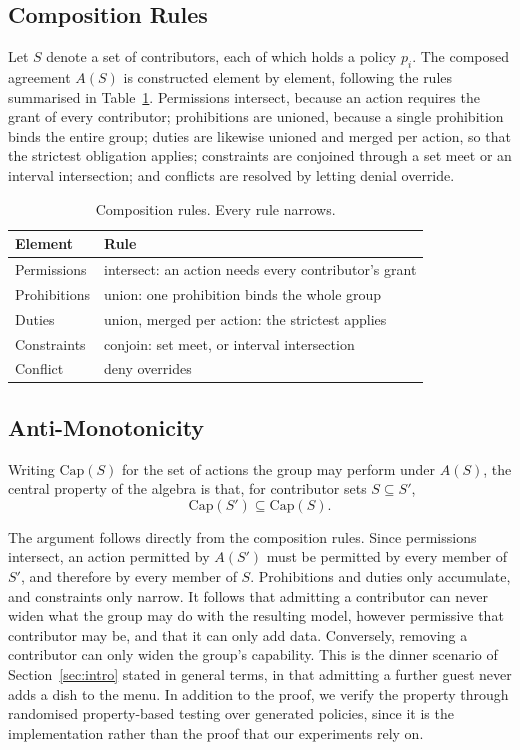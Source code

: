 \documentclass[sigconf,anonymous,review]{acmart}
\begin{document}
\subsection{Composition Rules}

Let $S$ denote a set of contributors, each of which holds a policy $p_i$. The
composed agreement $A(S)$ is constructed element by element, following the rules
summarised in Table~\ref{tab:rules}. Permissions intersect, because an action
requires the grant of every contributor; prohibitions are unioned, because a
single prohibition binds the entire group; duties are likewise unioned and merged
per action, so that the strictest obligation applies; constraints are conjoined
through a set meet or an interval intersection; and conflicts are resolved by
letting denial override.

\begin{table}[h]
\caption{Composition rules. Every rule narrows.}
\label{tab:rules}
\begin{tabular}{ll}
\toprule
Element & Rule \\
\midrule
Permissions & intersect: an action needs every contributor's grant \\
Prohibitions & union: one prohibition binds the whole group \\
Duties & union, merged per action: the strictest applies \\
Constraints & conjoin: set meet, or interval intersection \\
Conflict & deny overrides \\
\bottomrule
\end{tabular}
\end{table}

\subsection{Anti-Monotonicity}

Writing $\mathrm{Cap}(S)$ for the set of actions the group may perform under
$A(S)$, the central property of the algebra is that, for contributor sets
$S \subseteq S'$,
\[
\mathrm{Cap}(S') \subseteq \mathrm{Cap}(S).
\]

The argument follows directly from the composition rules. Since permissions
intersect, an action permitted by $A(S')$ must be permitted by every member of
$S'$, and therefore by every member of $S$. Prohibitions and duties only
accumulate, and constraints only narrow. It follows that admitting a contributor
can never widen what the group may do with the resulting model, however
permissive that contributor may be, and that it can only add data. Conversely,
removing a contributor can only widen the group's capability. This is the dinner
scenario of Section~\ref{sec:intro} stated in general terms, in that admitting
a further guest never adds a dish to the menu. In addition to the proof, we verify
the property through randomised property-based testing over generated policies,
since it is the implementation rather than the proof that our experiments rely
on.
\end{document}
